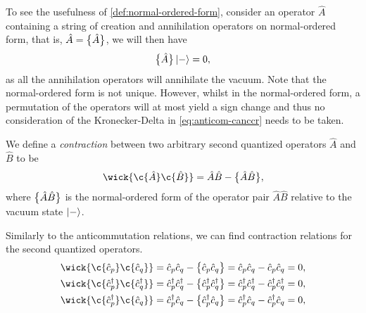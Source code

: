         To see the usefulness of \autoref{def:normal-ordered-form}, consider an
        operator $\hat{A}$ containing a string of creation and annihilation
        operators on normal-ordered form, that is, $\hat{A} = \bigl\{ \hat{A} \bigr\}$,
        we will then have
        \begin{align}
            \bigl\{ \hat{A} \bigr\}\ket{-} = 0,
        \end{align}
        as all the annihilation operators will annihilate the vacuum.
        Note that the normal-ordered form is not unique.
        However, whilst in the normal-ordered form, a permutation of the
        operators will at most yield a sign change and thus no consideration of
        the Kronecker-Delta in \autoref{eq:anticom-canccr} needs to be taken.

        \begin{definition}
            \label{def:contraction}
            We define a \emph{contraction} between two arbitrary second
            quantized operators $\hat{A}$ and $\hat{B}$ to be
            \begin{align}
                \wick{
                    \c {\hat{A}}
                    \c {\hat{B}}
                }
                = \hat{A}\hat{B}
                - \normalord{\hat{A}\hat{B}},
            \end{align}
            where $\bigl\{ \hat{A}\hat{B} \bigr\}$ is the normal-ordered form of the
            operator pair $\hat{A}\hat{B}$ relative to the vacuum state
            $\ket{-}$.
        \end{definition}
        Similarly to the anticommutation relations, we can find contraction
        relations for the second quantized operators.
        \begin{gather}
            \wick{
                \c {\can{p}}
                \c {\can{q}}
            }
            = \can{p}\can{q}
            - \normalord{\can{p}\can{q}}
            = \can{p}\can{q}
            - \can{p}\can{q}
            = 0,
            \\
            \wick{
                \c {\ccr{p}}
                \c {\ccr{q}}
            }
            = \ccr{p}\ccr{q}
            - \normalord{\ccr{p}\ccr{q}}
            = \ccr{p}\ccr{q}
            - \ccr{p}\ccr{q}
            = 0,
            \\
            \wick{
                \c {\ccr{p}}
                \c {\can{q}}
            }
            = \ccr{p}\can{q}
            - \normalord{\ccr{p}\can{q}}
            = \ccr{p}\can{q}
            - \ccr{p}\can{q}
            = 0,
        \end{gather}
